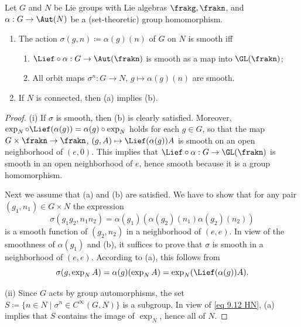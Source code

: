 \begin{lem}[{\cite[Lem.~9.2.26]{HN}}]\label{lem 9.2.26 HN}
    Let $G$ and $N$ be Lie groups with Lie algebras $\frakg,\frakn$, and $\alpha:G\to \Aut(N)$ be a (set-theoretic) group homomorphism.
    \begin{enumerate}[label=(\roman*)]
        \item The action $\sigma(g,n)\coloneqq \alpha(g)(n)$ of $G$ on $N$ is smooth iff 
        \begin{enumerate}[label=(\alph*)]
            \item $\Lief\circ\alpha:G\to \Aut(\frakn)$ is smooth as a map into $\GL(\frakn)$;
            \item All orbit maps $\sigma^n:G\to N$, $g\mapsto \alpha(g)(n)$ are smooth.
        \end{enumerate}
        \item If $N$ is connected, then (a) implies (b).
    \end{enumerate}
\end{lem}
\begin{proof}
    (i) If $\sigma$ is smooth, then (b) is clearly satisfied. Moreover, $\exp_N\circ\Lief(\alpha(g))=\alpha(g)\circ\exp_N$ holds for each $g\in G$, so that the map $G\times\frakn\to\frakn$, $(g,A)\mapsto \Lief(\alpha(g))A$ is smooth on an open neighborhood of $(e,0)$. This implies that $\Lief\circ\alpha:G\to \GL(\frakn)$ is smooth in an open neighborhood of $e$, hence smooth because it is a group homomorphism.

    Next we assume that (a) and (b) are satisfied. We have to show that for any pair $(g_1,n_1)\in G\times N$ the expression 
    \[\sigma(g_1g_2,n_1n_2)=\alpha(g_1)(\alpha(g_2)(n_1)\alpha(g_2)(n_2))\]
    is a smooth function of $(g_2,n_2)$ in a neighborhood of $(e,e)$. In view of the smoothness of $\alpha(g_1)$ and (b), it suffices to prove that $\sigma$ is smooth in a neighborhood of $(e,e)$. According to (a), this follows from 
    \[\sigma(g,\exp_N A)=\alpha(g)(\exp_N A)=\exp_N(\Lief(\alpha(g))A).\label{eq 9.12 HN}\]

    (ii) Since $G$ acts by group automorphisms, the set $S\coloneqq \{n\in N\mid \sigma^n\in C^\infty(G,N)\}$ is a subgroup. In view of \eqref{eq 9.12 HN}, (a) implies that $S$ contains the image of $\exp_N$, hence all of $N$.
\end{proof}


